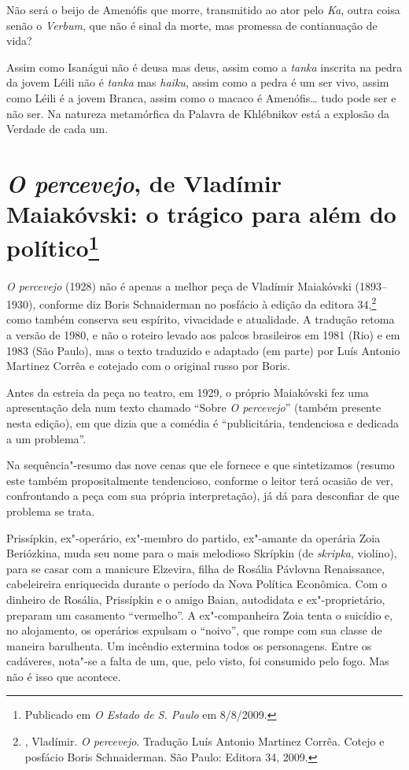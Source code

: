 {{{Não será o beijo de Amenófis que morre, transmitido ao ator pelo
\emph{Ka}, outra coisa senão o \emph{Verbum}, que não é sinal da morte,
mas promessa de contianuação de vida?

Assim como Isanágui não é deusa mas deus, assim como a \emph{tanka}
inscrita na pedra da jovem Léili não é \emph{tanka} mas \emph{haiku},
assim como a pedra é um ser vivo, assim como Léili é a jovem Branca,
assim como o macaco é Amenófis\ldots{} tudo pode ser e não ser. Na natureza
metamórfica da Palavra de Khlébnikov está a explosão da Verdade de cada
um.

\chapter{\emph{O percevejo}, de Vladímir Maiakóvski: o trágico para além
do político\footnote{Publicado em \emph{O Estado de S. Paulo} em
  8/8/2009.}}

\emph{O percevejo} (1928) não é apenas a melhor peça de Vladímir
Maiakóvski (1893--1930), conforme diz Boris Schnaiderman no posfácio à
edição da editora 34,\footnote{, Vladímir. \emph{O percevejo}.
  Tradução Luís Antonio Martinez Corrêa. Cotejo e posfácio Boris
  Schnaiderman. São Paulo: Editora 34, 2009.} como também conserva seu
espírito, vivacidade e atualidade. A tradução retoma a versão de 1980, e
não o roteiro levado aos palcos brasileiros em 1981 (Rio) e em 1983 (São
Paulo), mas o texto traduzido e adaptado (em parte) por Luís Antonio
Martinez Corrêa e cotejado com o original russo por Boris.

Antes da estreia da peça no teatro, em 1929, o próprio Maiakóvski fez
uma apresentação dela num texto chamado ``Sobre \emph{O percevejo}''
(também presente nesta edição), em que dizia que a comédia é
``publicitária, tendenciosa e dedicada a um problema''.

Na sequência"-resumo das nove cenas que ele fornece e que sintetizamos
(resumo este também propositalmente tendencioso, conforme o leitor terá
ocasião de ver, confrontando a peça com sua própria interpretação), já
dá para desconfiar de que problema se trata.

Prissípkin, ex"-operário, ex"-membro do partido, ex"-amante da operária
Zoia Beriózkina, muda seu nome para o mais melodioso Skrípkin (de
\emph{skripka}, violino), para se casar com a manicure Elzevira, filha
de Rosália Pávlovna Renaissance, cabeleireira enriquecida durante o
período da Nova Política Econômica. Com o dinheiro de Rosália,
Prissípkin e o amigo Baian, autodidata e ex"-proprietário, preparam um
casamento ``vermelho''. A ex"-companheira Zoia tenta o suicídio e, no
alojamento, os operários expulsam o ``noivo'', que rompe com sua classe de
maneira barulhenta. Um incêndio extermina todos os personagens. Entre os
cadáveres, nota"-se a falta de um, que, pelo visto, foi consumido pelo
fogo. Mas não é isso que acontece.

}}}

